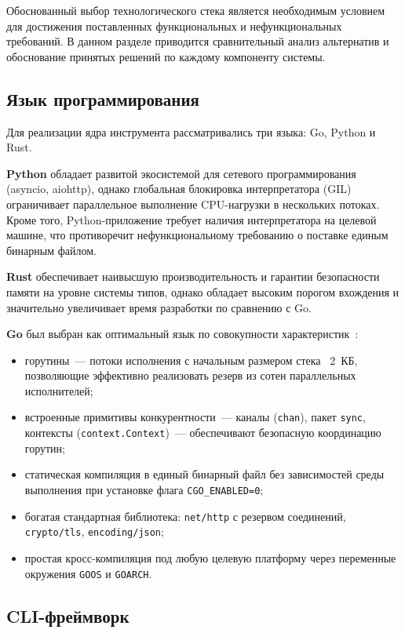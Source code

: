Обоснованный выбор технологического стека является необходимым условием для достижения
поставленных функциональных и нефункциональных требований.
В данном разделе приводится сравнительный анализ альтернатив и обоснование
принятых решений по каждому компоненту системы.

\subsection*{Язык программирования}

Для реализации ядра инструмента рассматривались три языка: Go, Python и Rust.

\textbf{Python} обладает развитой экосистемой для сетевого программирования
(asyncio, aiohttp), однако глобальная блокировка интерпретатора (GIL) ограничивает
параллельное выполнение CPU-нагрузки в нескольких потоках.
Кроме того, Python-приложение требует наличия интерпретатора на целевой машине,
что противоречит нефункциональному требованию о поставке единым бинарным файлом.

\textbf{Rust} обеспечивает наивысшую производительность и гарантии безопасности памяти
на уровне системы типов, однако обладает высоким порогом вхождения
и значительно увеличивает время разработки по сравнению с Go.

\textbf{Go} был выбран как оптимальный язык по совокупности характеристик~\cite{gospec}:
\begin{itemize}
  \item горутины~--- потоки исполнения с начальным размером стека ~2~КБ,
    позволяющие эффективно реализовать резерв из сотен параллельных исполнителей;
  \item встроенные примитивы конкурентности~--- каналы (\texttt{chan}),
    пакет \texttt{sync}, контексты (\texttt{context.Context})~---
    обеспечивают безопасную координацию горутин;
  \item статическая компиляция в единый бинарный файл без зависимостей среды выполнения
    при установке флага \texttt{CGO\_ENABLED=0};
  \item богатая стандартная библиотека: \texttt{net/http} с резервом соединений,
    \texttt{crypto/tls}, \texttt{encoding/json};
  \item простая кросс-компиляция под любую целевую платформу через переменные окружения
    \texttt{GOOS} и \texttt{GOARCH}.
\end{itemize}

\subsection*{CLI-фреймворк}

